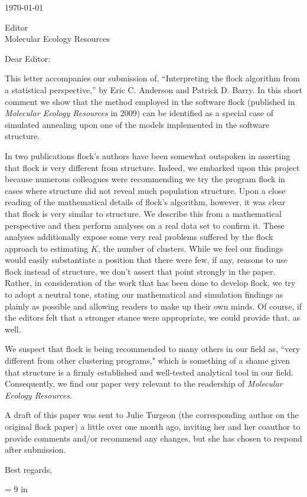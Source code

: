 \documentclass[11pt]{letter}
\date{}
\begin{document}
\begin{letter}{ \today 

Editor \\
Molecular Ecology Resources\\
}

\opening{Dear Editor:}
This letter accompanies our submission of, ``Interpreting the {\sc flock} algorithm from a statistical perspective,'' by Eric C. Anderson and Patrick D. Barry.  In this short comment we show that the method employed in the software {\sc flock} (published in {\em Molecular Ecology Resources} in 2009) can be identified as a special case of simulated annealing upon one of the models implemented in the software {\sc structure}.  

In two publications {\sc flock}'s authors have been somewhat outspoken in asserting that {\sc flock} is very different from {\sc structure}. Indeed, we embarked upon this project because numerous colleagues were recommending we try the program {\sc flock} in cases where {\sc structure} did not reveal much population structure.  Upon a close reading of the mathematical details of {\sc flock}'s algorithm, however, it was clear that {\sc flock} is very similar to {\sc structure}.  We describe this from a mathematical perspective and then perform analyses on a real data set to confirm it.  These analyses additionally expose some very real problems suffered by the {\sc flock} approach to estimating $K$, the number of clusters.  While we feel our findings would easily substantiate a position that there were few, if any, reasons to use {\sc flock} instead of {\sc structure}, we don't assert that point strongly in the paper. Rather, in consideration of the work that has been done to develop {\sc flock}, we try to adopt a neutral tone, stating our mathematical and simulation findings as plainly as possible and allowing readers to make up their own minds.  Of course, if the editors felt that a stronger stance were appropriate, we could provide that, as well.


We suspect that {\sc flock} is being recommended to many others in our field as, ``very different from other clustering programs," which is something of a shame given that {\sc structure} is a firmly established and well-tested analytical tool in our field.  Consequently, we find our paper very relevant to the readership of {\em Molecular Ecology Resources}. 

A draft of this paper was sent to Julie Turgeon (the corresponding author on the original {\sc flock} paper) a little over one month ago, inviting her and her coauthor to provide comments and/or recommend any changes, but she has chosen to respond after submission.


\closing{Best regards,}
\setlength{\topmargin}{0in}
\textheight = 9 in
\end{letter}

 
\end{document}

